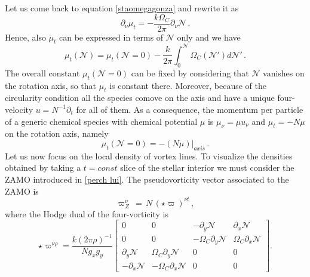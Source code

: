 \documentclass[usenatbib%
]{mnras}
\begin{document}

Let us come back to equation \eqref{staomegagonza} and  rewrite it as
\begin{equation}
\partial_\nu \mu_t = -\dfrac{k \Omega_C }{2\pi} \partial_\nu \mathcal{N} \, .
\end{equation} 
Hence,  also $\mu_t$ can be expressed in terms of  $\mathcal{N}$ only and we have
\begin{equation}\label{chepwer!}
\mu_t (\mathcal{N}) =\mu_t(\mathcal{N} =0) -\dfrac{k}{2\pi} \int_0^{\mathcal{N}} \Omega_C (\mathcal{N}') d\mathcal{N}' \, .
\end{equation}
The overall constant $\mu_t(\mathcal{N} =0)$ can be fixed by considering that  $\mathcal{N}$ vanishes on the rotation axis, so that  $\mu_t$ is constant  there. Moreover, because of the circularity condition all the species comove on the axis and have a unique four-velocity $ u = N^{-1} \partial_t$ for all of them. 
As a consequence, the momentum per particle of a generic chemical species with chemical potential $\mu$ is $\mu_\nu =\mu u_\nu$ and  $\mu_t = -N\mu$ on the rotation axis, namely
\begin{equation}\label{urca}
\mu_t (\mathcal{N}=0) = -(N \mu)|_{axis} \, . 
\end{equation}
Let us now focus  on the local density of vortex lines. To visualize the densities obtained by taking a $t=const$ slice of the stellar interior we must consider the ZAMO introduced in  \eqref{perch lui}. The pseudovorticity vector associated to the ZAMO is
\begin{equation}
\varpi_Z^\nu \, = \, N \, ({\star}\varpi)^{\nu t} \, ,
\end{equation}
where the Hodge dual of the four-vorticity is
\begin{equation}\label{maturohodgiato}
{\star}\varpi^{\nu \rho} \! \! = \! \! \dfrac{k(2\pi\rho)^{-1}}{  N g_x g_y} \! \! \! 
\begin{bmatrix}
  0  & 0 &  -\partial_y \mathcal{N} &  \partial_x \mathcal{N}  \\
   0 & 0 & -\Omega_C \partial_y \mathcal{N} & \Omega_C \partial_x \mathcal{N}  \\
    \partial_y \mathcal{N} & \Omega_C \partial_y \mathcal{N}  & 0 & 0  \\
   -\partial_x \mathcal{N} & -\Omega_C \partial_x \mathcal{N} & 0 & 0
\end{bmatrix}  .
\end{equation}
\end{document}
